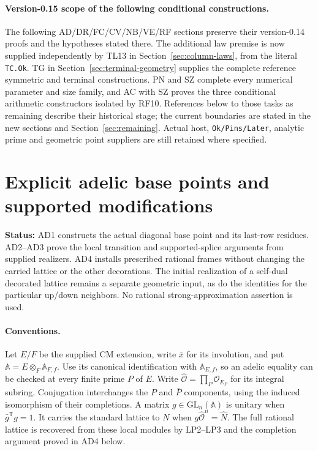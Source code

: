 \documentclass[11pt,a4paper]{article}
\numberwithin{equation}{section}
\theoremstyle{remark}\newtheorem{remark}[theorem]{Remark}
\newcommand{\status}[1]{\textbf{Status:} #1}
\begin{document}
\paragraph{Version-0.15 scope of the following conditional constructions.}
The following AD/DR/FC/CV/NB/VE/RF sections preserve their version-0.14
proofs and the hypotheses stated there. The additional law premise is now
supplied independently by TL13 in Section~\ref{sec:column-laws}, from
the literal \texttt{TC.Ok}. TG in Section~\ref{sec:terminal-geometry}
supplies the complete reference symmetric and terminal constructions.
PN and SZ complete every numerical parameter and size family, and AC
with SZ proves the three conditional arithmetic constructors isolated
by RF10. References below to those tasks as remaining describe their
historical stage; the current boundaries are stated in the new sections
and Section~\ref{sec:remaining}. Actual host, \texttt{Ok/Pins/Later},
analytic prime and geometric point suppliers are still retained where
specified.

\section{Explicit adelic base points and supported modifications}
\label{sec:adelic-geometry}

\status{AD1 constructs the actual diagonal base point and its last-row
residues. AD2--AD3 prove the local transition and supported-splice
arguments from supplied realizers. AD4 installs prescribed rational
frames without changing the carried lattice or the other decorations.
The initial realization of a self-dual decorated lattice remains a
separate geometric input, as do the identities for the particular
up/down neighbors. No rational strong-approximation assertion is used.}

\paragraph{Conventions.}
Let $E/F$ be the supplied CM extension, write $\bar x$ for its
involution, and put $\mathbb A=E\otimes_F\mathbb A_{F,f}$.
Use its canonical identification with $\mathbb A_{E,f}$, so an
adelic equality can be checked at every finite prime $P$ of $E$.
Write $\widehat{\mathcal O}=\prod_P\mathcal O_{E_P}$ for its
integral subring. Conjugation interchanges the $P$ and $\bar P$
components, using the induced isomorphism of their completions.
A matrix $g\in\mathrm{GL}_n(\mathbb A)$ is unitary when
$\bar g^{\mathsf T}g=1$. It carries the standard lattice to $N$
when $g\widehat{\mathcal O}^{n}=\widehat N$.
The full rational lattice is recovered from these local modules
by LP2--LP3 and the completion argument proved in AD4 below.
\end{document}
